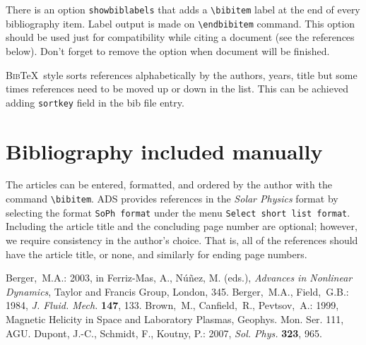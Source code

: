 \documentclass[namedreferences,hyperref,optionalrh]{spr-sola}
\newcommand{\BibTeX}{\textsc{Bib}\TeX}
\newcommand{\solphys}{{\it Sol. Phys.}}
\begin{document}
There is an option \texttt{showbiblabels} that adds a \verb+\bibitem+ 
label at the end of every bibliography item. Label output is made on \verb+\endbibitem+ command.
This option should be used 
just for compatibility while citing a document (see the references below). 
Don't forget to remove the option when document will be finished.

\BibTeX\ style sorts references alphabetically by the authors, years, title but some times references
need to be moved up or down in the list. This can be achieved adding \verb+sortkey+ field in the bib file entry.


  

 {\typeout{}
\typeout{****************************************************}
\typeout{****************************************************}
  
\typeout{****************************************************}
\typeout{****************************************************}
\typeout{}}

\section*{Bibliography included manually }
  The articles can be entered, formatted, and ordered  
by the author with the command \verb+\bibitem+.  ADS provides
references in the {\it Solar Physics} format by selecting
the format \verb+SoPh format+ under the menu 
\verb+Select short list format+.    Including the article title
and the concluding page number are optional;
however, we require consistency in the author's choice.
That is, all of the references should have the article title, or none,
and similarly for ending page numbers.

\begin{thebibliography}{}
Berger,~M.A.: 
2003, in Ferriz-Mas, A., N{\'u}{\~n}ez, M. (eds.),
\textit{Advances in Nonlinear Dynamics}, Taylor and Francis Group, 
London, 345.
Berger,~M.A., Field,~G.B.: 
1984, \textit{J. Fluid. Mech.} \textbf{147}, 133.
Brown,~M., Canfield,~R., Pevtsov,~A.:
1999, Magnetic Helicity in Space and Laboratory Plasmas, Geophys. Mon. 
Ser. 111, AGU.
Dupont, J.-C., Schmidt, F., Koutny, P.: 2007, \solphys{} \textbf{323}, 965. 
\end{thebibliography}
\end{document}
